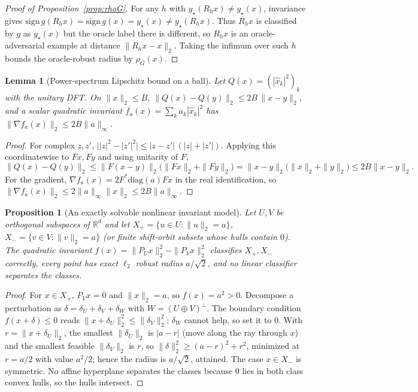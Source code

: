 \documentclass{article}
\newtheorem{lemma}{Lemma}
\newtheorem{proposition}{Proposition}
\theoremstyle{definition}
\newcommand{\R}{\mathbb{R}}
\newcommand{\dd}{d}
\begin{document}
\begin{proof}[Proof of Proposition~\ref{prop:rhoG}]
For any $h$ with $y_\star(R_hx)\neq y_\star(x)$, invariance gives $\mathrm{sign}\,g(R_hx)=\mathrm{sign}\,g(x)=y_\star(x)\neq y_\star(R_hx)$. Thus $R_hx$ is classified by $g$ as $y_\star(x)$ but the oracle label there is different, so $R_hx$ is an oracle-adversarial example at distance $\|R_hx-x\|_2$. Taking the infimum over such $h$ bounds the oracle-robust radius by $\rho_G(x)$.
\end{proof}

\begin{lemma}[Power-spectrum Lipschitz bound on a ball]\label{lem:ps-lip}
Let $Q(x)=(|\hat x_k|^2)_{k}$ with the unitary DFT. On $\|x\|_2\le B$, $\|Q(x)-Q(y)\|_2\le 2B\,\|x-y\|_2$, and a scalar quadratic invariant $f_a(x)=\sum_k a_k|\hat x_k|^2$ has $\|\nabla f_a(x)\|_2\le 2B\|a\|_\infty$.
\end{lemma}
\begin{proof}
For complex $z,z'$, $\big||z|^2-|z'|^2\big|\le|z-z'|\,(|z|+|z'|)$. Applying this coordinatewise to $Fx,Fy$ and using unitarity of $F$,
\[
\|Q(x)-Q(y)\|_2\le\|F(x-y)\|_2\big(\|Fx\|_2+\|Fy\|_2\big)=\|x-y\|_2\big(\|x\|_2+\|y\|_2\big)\le 2B\|x-y\|_2 .
\]
For the gradient, $\nabla f_a(x)=2F^{*}\mathrm{diag}(a)Fx$ in the real identification, so $\|\nabla f_a(x)\|_2\le 2\|a\|_\infty\|x\|_2\le 2B\|a\|_\infty$.
\end{proof}

\begin{proposition}[An exactly solvable nonlinear invariant model]\label{thm:toy}
Let $U,V$ be orthogonal subspaces of $\R^\dd$ and let $X_+=\{u\in U:\|u\|_2=a\}$, $X_-=\{v\in V:\|v\|_2=a\}$ (or finite shift-orbit subsets whose hulls contain $0$). The quadratic invariant $f(x)=\|P_Ux\|_2^2-\|P_Vx\|_2^2$ classifies $X_+,X_-$ correctly, every point has exact $\ell_2$ robust radius $a/\sqrt2$, and no linear classifier separates the classes.
\end{proposition}
\begin{proof}
For $x\in X_+$, $P_Vx=0$ and $\|x\|_2=a$, so $f(x)=a^2>0$. Decompose a perturbation as $\delta=\delta_U+\delta_V+\delta_W$ with $W=(U\oplus V)^\perp$. The boundary condition $f(x+\delta)\le0$ reads $\|x+\delta_U\|_2^2\le\|\delta_V\|_2^2$; $\delta_W$ cannot help, so set it to $0$. With $r=\|x+\delta_U\|_2$, the smallest $\|\delta_U\|_2$ is $|a-r|$ (move along the ray through $x$) and the smallest feasible $\|\delta_V\|_2$ is $r$, so $\|\delta\|_2^2\ge(a-r)^2+r^2$, minimized at $r=a/2$ with value $a^2/2$; hence the radius is $a/\sqrt2$, attained. The case $x\in X_-$ is symmetric. No affine hyperplane separates the classes because $0$ lies in both class convex hulls, so the hulls intersect.
\end{proof}
\end{document}
